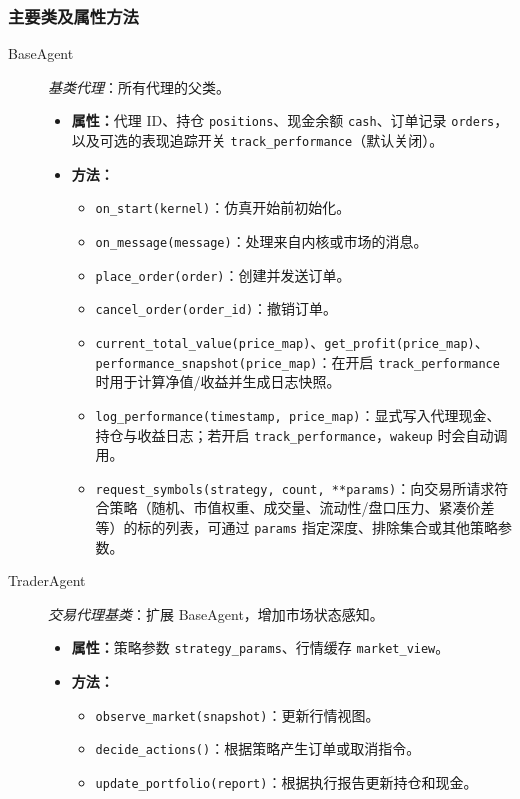 \subsubsection{主要类及属性方法}
\begin{description}
  \item[BaseAgent] \emph{基类代理}：所有代理的父类。
  \begin{itemize}
    \item \textbf{属性：}代理 ID、持仓 \verb|positions|、现金余额 \verb|cash|、订单记录 \verb|orders|，以及可选的表现追踪开关 \verb|track_performance|（默认关闭）。
    \item \textbf{方法：}
      \begin{itemize}
        \item \verb|on_start(kernel)|：仿真开始前初始化。
        \item \verb|on_message(message)|：处理来自内核或市场的消息。
        \item \verb|place_order(order)|：创建并发送订单。
        \item \verb|cancel_order(order_id)|：撤销订单。
        \item \verb|current_total_value(price_map)|、\verb|get_profit(price_map)|、\verb|performance_snapshot(price_map)|：在开启 \verb|track_performance| 时用于计算净值/收益并生成日志快照。
        \item \verb|log_performance(timestamp, price_map)|：显式写入代理现金、持仓与收益日志；若开启 \verb|track_performance|，\verb|wakeup| 时会自动调用。
        \item \verb|request_symbols(strategy, count, **params)|：向交易所请求符合策略（随机、市值权重、成交量、流动性/盘口压力、紧凑价差等）的标的列表，可通过 \verb|params| 指定深度、排除集合或其他策略参数。
      \end{itemize}
  \end{itemize}
  \item[TraderAgent] \emph{交易代理基类}：扩展 BaseAgent，增加市场状态感知。
  \begin{itemize}
    \item \textbf{属性：}策略参数 \verb|strategy_params|、行情缓存 \verb|market_view|。
    \item \textbf{方法：}
      \begin{itemize}
        \item \verb|observe_market(snapshot)|：更新行情视图。
        \item \verb|decide_actions()|：根据策略产生订单或取消指令。
        \item \verb|update_portfolio(report)|：根据执行报告更新持仓和现金。

\end{itemize}
\end{itemize}
\end{description}
